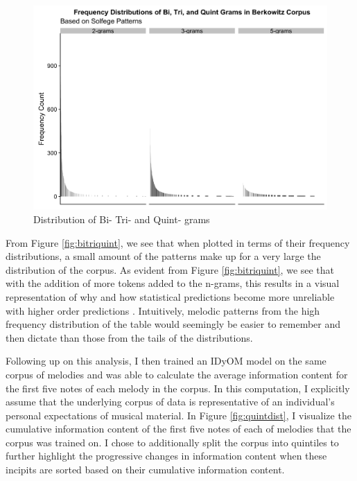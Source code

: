 \documentclass[12pt,]{book}
\begin{document}
\begin{figure}

{\centering \includegraphics[width=1\linewidth]{img/bitriquint} 

}

\caption{Distribution of Bi- Tri- and Quint- grams}\label{fig:bitriquint2}
\end{figure}

From Figure \ref{fig:bitriquint}, we see that when plotted in terms of their frequency distributions, a small amount of the patterns make up for a very large the distribution of the corpus.
As evident from Figure \ref{fig:bitriquint}, we see that with the addition of more tokens added to the n-grams, this results in a visual representation of why and how statistical predictions become more unreliable with higher order predictions \citep{conklinMultipleViewpointSystems1995}.
Intuitively, melodic patterns from the high frequency distribution of the table would seemingly be easier to remember and then dictate than those from the tails of the distributions.

Following up on this analysis, I then trained an IDyOM model on the same corpus of melodies and was able to calculate the average information content for the first five notes of each melody in the corpus.
In this computation, I explicitly assume that the underlying corpus of data is representative of an individual's personal expectations of musical material.
In Figure \ref{fig:quintdist}, I visualize the cumulative information content of the first five notes of each of melodies that the corpus was trained on.
I chose to additionally split the corpus into quintiles to further highlight the progressive changes in information content when these incipits are sorted based on their cumulative information content.
\end{document}
